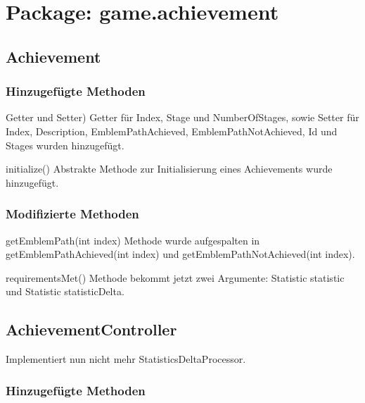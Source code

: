 \section{Package: game.achievement}

\subsection{Achievement}

\subsubsection{Hinzugefügte Methoden}

\begin{description}
	\item{Getter und Setter)}
	Getter für Index, Stage und NumberOfStages, sowie Setter für Index, Description, EmblemPathAchieved, EmblemPathNotAchieved, Id und Stages wurden hinzugefügt.
	
	\item{initialize()}
	Abstrakte Methode zur Initialisierung eines Achievements wurde hinzugefügt.

	
\end{description}



\subsubsection{Modifizierte Methoden}

\begin{description}
	\item{getEmblemPath(int index)}
	Methode wurde aufgespalten in getEmblemPathAchieved(int index) und getEmblemPathNotAchieved(int index).
	
	\item{requirementsMet()}
	Methode bekommt jetzt zwei Argumente: Statistic statistic und Statistic statisticDelta.
\end{description}


\subsection{AchievementController}
Implementiert nun nicht mehr StatisticsDeltaProcessor.

\subsubsection{Hinzugefügte Methoden}

